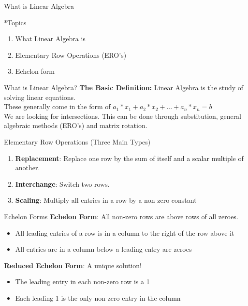 \documentclass[a4paper, 12pt]{article}
\begin{document}
\begin{section}{What is Linear Algebra}
\begin{subsection}*{Topics}
\begin{enumerate}
		\item{What Linear Algebra is}
		\item{Elementary Row Operations (ERO's)}
		\item{Echelon form}
\end{enumerate}
\end{subsection}
\begin{subsection}{What is Linear Algebra?}
\textbf{The Basic Definition:} Linear Algebra is the study of 
solving linear equations.\\ These generally come in the form of
$a_1*x_1+a_2*x_2+...+a_n*x_n=b$\\ We are looking for intersections.
This can be done through substitution, general algebraic methods 
(ERO's) and matrix rotation. \\
\end{subsection}
\begin{subsection}{Elementary Row Operations (Three Main Types)}
\begin{enumerate}
	\item{\textbf{Replacement}: Replace one row by the 
		sum of itself and a scalar multiple of another.}
	\item{\textbf{Interchange}: Switch two rows.}
	\item{\textbf{Scaling}: Multiply all entries in a row by
		a non-zero constant}
\end{enumerate}
\end{subsection}
\begin{subsection}{Echelon Forms}
	\textbf{Echelon Form}: All non-zero rows are above rows
	of all zeroes.
	\begin{itemize}
	\item{All leading entries of a row is in a column to 
		the right of the row above it}
	\item{All entries are in a column below a leading entry
		are zeroes}
\end{itemize}
\textbf{Reduced Echelon Form}: A unique solution!
\begin{itemize}
\item{The leading entry in each non-zero row is a 1}
\item{Each leading 1 is the only non-zero entry in the column}
\end{itemize}
\end{subsection}


\end{section}
\end{document}
